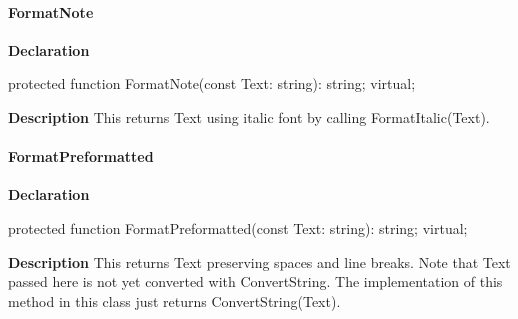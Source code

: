 \documentclass{report}
\newif\ifpdf
\begin{document}
\paragraph*{FormatNote}\hspace*{\fill}

\label{PasDoc_Gen.TDocGenerator-FormatNote}
\begin{list}{}{
\setlength{\itemindent}{0cm}
\setlength{\listparindent}{0cm}
\setlength{\leftmargin}{\evensidemargin}
\addtolength{\leftmargin}{\tmplength}
\settowidth{\labelsep}{X}
\addtolength{\leftmargin}{\labelsep}
\setlength{\labelwidth}{\tmplength}
}
\item[\textbf{Declaration}\hfill]
\ifpdf
\begin{flushleft}
\fi
\begin{ttfamily}
protected function FormatNote(const Text: string): string; virtual;\end{ttfamily}

\ifpdf
\end{flushleft}
\fi

\par
\item[\textbf{Description}]
This returns Text using italic font by calling FormatItalic(Text).

\end{list}
\paragraph*{FormatPreformatted}\hspace*{\fill}

\label{PasDoc_Gen.TDocGenerator-FormatPreformatted}
\begin{list}{}{
\setlength{\itemindent}{0cm}
\setlength{\listparindent}{0cm}
\setlength{\leftmargin}{\evensidemargin}
\addtolength{\leftmargin}{\tmplength}
\settowidth{\labelsep}{X}
\addtolength{\leftmargin}{\labelsep}
\setlength{\labelwidth}{\tmplength}
}
\item[\textbf{Declaration}\hfill]
\ifpdf
\begin{flushleft}
\fi
\begin{ttfamily}
protected function FormatPreformatted(const Text: string): string; virtual;\end{ttfamily}

\ifpdf
\end{flushleft}
\fi

\par
\item[\textbf{Description}]
This returns Text preserving spaces and line breaks. Note that Text passed here is not yet converted with ConvertString. The implementation of this method in this class just returns ConvertString(Text).

\end{list}
\end{document}
